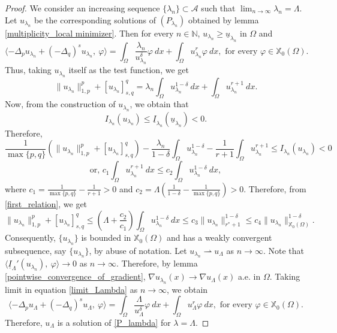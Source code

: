 \documentclass[reqno,oneside]{amsart}
\theoremstyle{definition}
\theoremstyle{remark}
\numberwithin{equation}{section}
\newcommand{\Om} {\Omega}
\newcommand{\p}{\Delta_p}
\newcommand{\qs}{(-\Delta_q)^s}
\newcommand{\rar}{\rightarrow}
\newcommand{\na} {\nabla}
\newcommand{\sn}{\mathbb{N}}
\newcommand{\xo}{\mathbb{X}_0}
\newcommand{\il}{\underline{I}}
\newcommand{\la} {\lambda}
\begin{document}
\begin{proof}
    We consider an increasing sequence $\{\la_n\} \subset \mathcal{A}$ such that $\lim_{n\rar\infty} \la_n = \Lambda$. Let $u_{\la_n}$ be the corresponding solutions of $(P_{\la_n})$ obtained by lemma \ref{multiplicity_local minimizer}. Then for every $n\in\sn$, $u_{\la_n} \geq \underline{u}_{\la_n}$ in $\Om$ and
    \begin{equation}\label{limit_Lambda}
        \langle -\p u_{\la_n} + \qs u_{\la_n},\ \varphi \rangle = \int_{\Om} \frac{\la_n}{u_{\la_n}^{\delta}} \varphi\ dx + \int_{\Om} u_{\la_n}^r \varphi\ dx, \text{ for every } \varphi\in \xo(\Om).
    \end{equation}
    Thus, taking $u_{\la_n}$ itself as the test function, we get
    \begin{equation}\label{first_relation}
        \|u_{\la_n}\|^p_{1,p} + [u_{\la_n}]^q_{s,q} = \la_n \int_{\Om} u_{\la_n}^{1-\delta}\ dx + \int_{\Om} u_{\la_n}^{r+1}\ dx.
    \end{equation}
    Now, from the construction of $u_{\la_n}$, we obtain that
    \[ I_{\la_n}(u_{\la_n}) \leq \il_{\la_n} (\underline{u}_{\la_n} ) <0.\]
    Therefore,
    \begin{equation*}
        \frac{1}{\max \{ p,q\}} \left(\|u_{\la_n}\|^p_{1,p} + [u_{\la_n}]^q_{s,q} \right) - \frac{\la_n}{1-\delta} \int_{\Om} u_{\la_n}^{1-\delta} - \frac{1}{r+1} \int_{\Om} u_{\la_n}^{r+1} \leq I_{\la_n}(u_{\la_n}) < 0
    \end{equation*}
    \begin{equation}
        \text{or, } c_1 \int_{\Om} u_{\la_n}^{r+1}\ dx \leq c_2 \int_{\Om} u_{\la_n}^{1-\delta}\ dx,
    \end{equation}
    where $c_1= \frac{1}{\max \{ p,q\}} - \frac{1}{r+1} >0$ and $c_2 = \Lambda \left(\frac{1}{1-\delta} - \frac{1}{\max \{ p,q\}}\right) >0$. Therefore, from \eqref{first_relation}, we get
    \begin{equation}
        \|u_{\la_n}\|^p_{1,p} + [u_{\la_n}]^q_{s,q} \leq \left(\Lambda + \frac{c_2}{c_1} \right) \int_{\Om} u_{\la_n}^{1-\delta}\ dx \leq c_3 \|u_{\la_n}\|^{1-\delta}_{r^* +1} \leq c_4 \|u_{\la_n}\|^{1-\delta}_{\xo(\Om)}.
    \end{equation}
    Consequently, $\{u_{\la_n}\}$ is bounded in $\xo(\Om)$ and has a weakly convergent subsequence, say $\{u_{\la_n}\}$, by abuse of notation. Let $u_{\la_n} \rightharpoonup u_{\Lambda}$ as $n\rar\infty$. Note that $\langle\il_{\Lambda}' (u_{\la_n}),\ \varphi \rangle \rar 0$ as $n\rar\infty$. Therefore, by lemma \ref{pointwise_convergence_of_gradient}, $\na u_{\la_n} (x) \rar \na u_{\Lambda} (x)$ a.e. in $\Om$. Taking limit in equation \eqref{limit_Lambda} as $n\rar\infty$, we obtain
    \[\langle -\p u_{\Lambda} + \qs u_{\Lambda},\ \varphi \rangle = \int_{\Om} \frac{\Lambda}{u_{\Lambda}^{\delta}} \varphi\ dx + \int_{\Om} u_{\Lambda}^r \varphi\ dx, \text{ for every } \varphi\in \xo(\Om). \]
    Therefore, $u_{\Lambda}$ is a solution of \eqref{P_lambda} for $\la = \Lambda$.
\end{proof}
\end{document}

